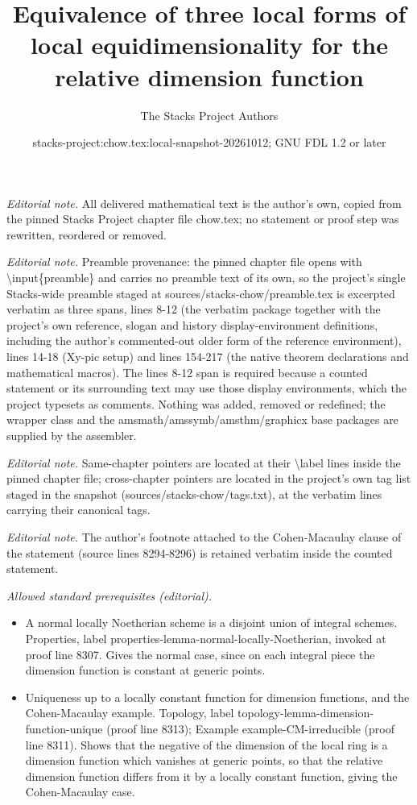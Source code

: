 \documentclass[10pt,a4paper]{amsart}
\title{Equivalence of three local forms of local equidimensionality for the relative dimension function}
\author{The Stacks Project Authors}
\date{stacks-project:chow.tex:local-snapshot-20261012; GNU FDL 1.2 or later}
\theoremstyle{plain}
\theoremstyle{definition}
\theoremstyle{remark}
\numberwithin{equation}{subsection}
\begin{document}
\maketitle
\noindent\textit{Editorial note.} All delivered mathematical text is the author's own, copied from the pinned Stacks Project chapter file chow.tex; no statement or proof step was rewritten, reordered or removed.\par\medskip
\noindent\textit{Editorial note.} Preamble provenance: the pinned chapter file opens with \textbackslash{}input\{preamble\} and carries no preamble text of its own, so the project's single Stacks-wide preamble staged at sources/stacks-chow/preamble.tex is excerpted verbatim as three spans, lines 8-12 (the verbatim package together with the project's own reference, slogan and history display-environment definitions, including the author's commented-out older form of the reference environment), lines 14-18 (Xy-pic setup) and lines 154-217 (the native theorem declarations and mathematical macros). The lines 8-12 span is required because a counted statement or its surrounding text may use those display environments, which the project typesets as comments. Nothing was added, removed or redefined; the wrapper class and the amsmath/amssymb/amsthm/graphicx base packages are supplied by the assembler.\par\medskip
\noindent\textit{Editorial note.} Same-chapter pointers are located at their \textbackslash{}label lines inside the pinned chapter file; cross-chapter pointers are located in the project's own tag list staged in the snapshot (sources/stacks-chow/tags.txt), at the verbatim lines carrying their canonical tags.\par\medskip
\noindent\textit{Editorial note.} The author's footnote attached to the Cohen-Macaulay clause of the statement (source lines 8294-8296) is retained verbatim inside the counted statement.\par\medskip
\noindent\textit{Allowed standard prerequisites (editorial).}\begin{itemize}
\item A normal locally Noetherian scheme is a disjoint union of integral schemes. Properties, label properties-lemma-normal-locally-Noetherian, invoked at proof line 8307. Gives the normal case, since on each integral piece the dimension function is constant at generic points.
\item Uniqueness up to a locally constant function for dimension functions, and the Cohen-Macaulay example. Topology, label topology-lemma-dimension-function-unique (proof line 8313); Example example-CM-irreducible (proof line 8311). Shows that the negative of the dimension of the local ring is a dimension function which vanishes at generic points, so that the relative dimension function differs from it by a locally constant function, giving the Cohen-Macaulay case.
\end{itemize}\medskip
\end{document}
